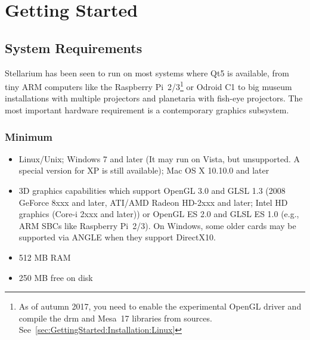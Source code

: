 

\chapter{Getting Started}
\label{ch:GettingStarted}

\section{System Requirements}
\label{sec:GettingStarted:SystemRequirements}

Stellarium has been seen to run on most systems where Qt5 is
available, from tiny ARM computers like the Raspberry Pi~2/3\footnote{As
  of autumn 2017, you need to enable the experimental OpenGL driver
  and compile the drm and Mesa~17 libraries from sources. 
  See~\ref{sec:GettingStarted:Installation:Linux}} 
or Odroid C1 to big museum installations with multiple projectors 
and planetaria with fish-eye projectors. 
The most important hardware requirement is a contemporary graphics subsystem.


\subsection{Minimum}
\begin{itemize}
\item Linux/Unix; Windows 7 and later (It may run on Vista, but unsupported. A special version for XP is still available); Mac OS X 10.10.0 and later
\item 3D graphics capabilities which support OpenGL 3.0 and GLSL 1.3 (2008
  GeForce 8xxx and later, ATI/AMD Radeon HD-2xxx and later; Intel HD
  graphics (Core-i 2xxx and later)) or OpenGL ES 2.0 and GLSL ES 1.0
  (e.g., ARM SBCs like Raspberry Pi~2/3). On Windows, some older cards
  may be supported via ANGLE when they support DirectX10.
\item 512 MB RAM
\item 250 MB free on disk
\end{itemize}

